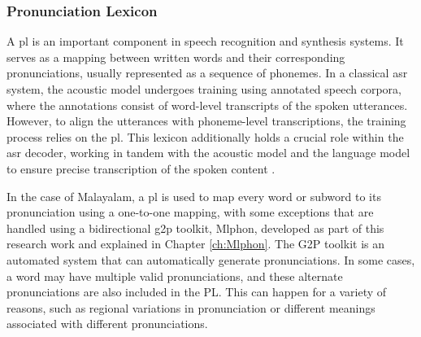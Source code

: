 \subsubsection{Pronunciation Lexicon}


A \acrfull{pl} is an important component in speech recognition and synthesis systems. It serves as a mapping between written words and their corresponding pronunciations, usually represented as a sequence of phonemes. In a classical \gls{asr} system, the acoustic model undergoes training using annotated speech corpora, where the annotations consist of word-level transcripts of the spoken utterances. However, to align the utterances with phoneme-level transcriptions, the training process relies on the \gls{pl}. This lexicon additionally holds a crucial role within the \gls{asr} decoder, working in tandem with the acoustic model and the language model to ensure precise transcription of the spoken content \cite{benesty2008springer}.

In the case of Malayalam, a \gls{pl} is used to map every word or subword to its pronunciation using a one-to-one mapping, with some exceptions that are handled using a bidirectional \gls{g2p} toolkit, Mlphon, developed as part of this research work and explained in Chapter \ref{ch:Mlphon}. The G2P toolkit is an automated system that can automatically generate pronunciations. In some cases, a word may have multiple valid pronunciations, and these alternate pronunciations are also included in the PL. This can happen for a variety of reasons, such as regional variations in pronunciation or different meanings associated with different pronunciations.


